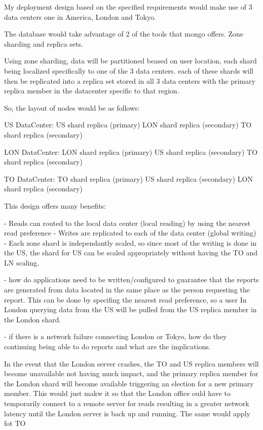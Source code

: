 My deployment design based on the specified requirements would make use of 3 data centers one in America, London and Tokyo.

The database would take advantage of 2 of the tools that mongo offers. Zone sharding and replica sets.

Using zone sharding, data will be partitioned beased on user location, each shard being localized specifically to one of the 3 data centers. each of these shards will then be replicated into a replica set stored in all 3 data centers with the primary replica member in the datacenter specific to that region. 

So, the layout of nodes would be as follows:

US DataCenter:
US shard replica (primary)
LON shard replica (secondary)
TO shard replica (secondary)

LON DataCenter:
LON shard replica (primary)
US shard replica (secondary)
TO shard replica (secondary)

TO DataCenter:
TO shard replica (primary)
US shard replica (secondary)
LON shard replica (secondary)

This design offers many benefits:

- Reads can routed to the local data center (local reading) by using the nearest read preference
- Writes are replicated to each of the data center  (global writing)
- Each zone shard is independantly scaled, so since most of the writing is done in the US, the shard for US can be scaled appropriately without having the TO and LN scaling.


- how do applications need to be written/configured to guarantee that the reports are generated from data located in the same place as the person requesting the report.
This can be done by specifing the nearest read preference, so a user In London querying data from the US will be pulled from the US replica member in the London shard.

- if there is a network failure connecting London or Tokyo, how do they continuing being able to do reports and what are the implications.

In the event that the London server crashes, the TO and US replica members will become unavailable not having much impact, and the primary replica member for the London shard will become available triggering an election for a new primary member. This would just makw it so that the London office ould have to temporarily connect to a remote server for reads resulting in a greater network latency until the London server is back up and running. The same would apply fot TO

